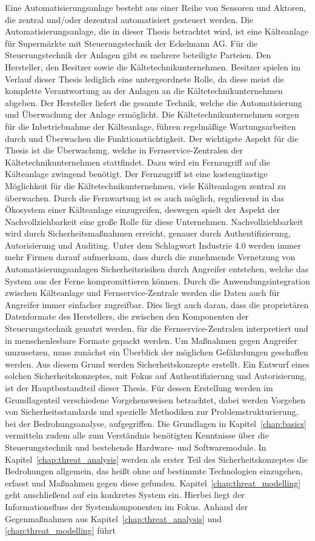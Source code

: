 \documentclass[11pt,a4paper]{report}
\begin{document}
Eine Automatisierungsanlage besteht aus einer Reihe von Sensoren und Aktoren, die zentral und/oder dezentral automatisiert gesteuert werden. Die Automatisierungsanlage, die in dieser Thesis betrachtet wird, ist eine Kälteanlage für Supermärkte mit Steuerungstechnik der Eckelmann AG. Für die Steuerungstechnik der Anlagen gibt es mehrere beteiligte Parteien. Den Hersteller, den Besitzer sowie die Kältetechnikunternehmen. Besitzer spielen im Verlauf dieser Thesis lediglich eine untergeordnete Rolle, da diese meist die komplette Verantwortung an der Anlagen an die Kältetechnikunternehmen abgeben. Der Hersteller liefert die gesamte Technik, welche die Automatisierung und Überwachung der Anlage ermöglicht. Die Kältetechnikunternehmen sorgen für die Inbetriebnahme der Kälteanlage, führen regelmäßige Wartungsarbeiten durch und Überwachen die Funktionstüchtigkeit. Der wichtigste Aspekt für die Thesis ist die Überwachung, welche in Fernservice-Zentralen der Kältetechnikunternehmen stattfindet. Dazu wird ein Fernzugriff auf die Kälteanlage zwingend benötigt. Der Fernzugriff ist eine kostengünstige Möglichkeit für die Kältetechnikunternehmen, viele Kälteanlagen zentral zu überwachen. Durch die Fernwartung ist es auch möglich, regulierend in das Ökosystem einer Kälteanlage einzugreifen, deswegen spielt der Aspekt der Nachvollziehbarkeit eine große Rolle für diese Unternehmen. Nachvollziehbarkeit wird durch Sicherheitsmaßnahmen erreicht, genauer durch Authentifizierung, Autorisierung und Auditing. Unter dem Schlagwort Industrie 4.0 werden immer mehr Firmen darauf aufmerksam, dass durch die zunehmende Vernetzung von Automatisierungsanlagen Sicherheitsrisiken durch Angreifer entstehen, welche das System aus der Ferne kompromittieren können. Durch die Anwendungsintegration zwischen Kälteanlage und Fernservice-Zentrale werden die Daten auch für Angreifer immer einfacher zugreifbar. Dies liegt auch daran, dass die proprietären Datenformate des Herstellers, die zwischen den Komponenten der Steuerungstechnik genutzt werden, für die Fernservice-Zentralen interpretiert und in menschenlesbare Formate gepackt werden. Um Maßnahmen gegen Angreifer umzusetzen, muss zunächst ein Überblick der möglichen Gefährdungen geschaffen werden. Aus diesem Grund werden Sicherheitskonzepte erstellt. Ein Entwurf eines solchen Sicherheitskonzeptes, mit Fokus auf Authentifizierung und Autorisierung, ist der Hauptbestandteil dieser Thesis. Für dessen Erstellung werden im Grundlagenteil verschiedene Vorgehensweisen betrachtet, dabei werden Vorgehen von Sicherheitsstandards und spezielle Methodiken zur Problemstrukturierung, bei der Bedrohungsanalyse, aufgegriffen. Die Grundlagen in Kapitel~\ref{chap:basics} vermitteln zudem alle zum Verständnis benötigten Kenntnisse über die Steuerungstechnik und bestehende Hardware- und Softwaremodule. In Kapitel~\ref{chap:threat_analysis} werden als erster Teil des Sicherheitskonzeptes die Bedrohungen allgemein, das heißt ohne auf bestimmte Technologien einzugehen, erfasst und Maßnahmen gegen diese gefunden. Kapitel~\ref{chap:threat_modelling} geht anschließend auf ein konkretes System ein. Hierbei liegt der Informationsfluss der Systemkomponenten im Fokus. Anhand der Gegenmaßnahmen aus Kapitel~\ref{chap:threat_analysis} und \ref{chap:threat_modelling} führt 
\end{document}
